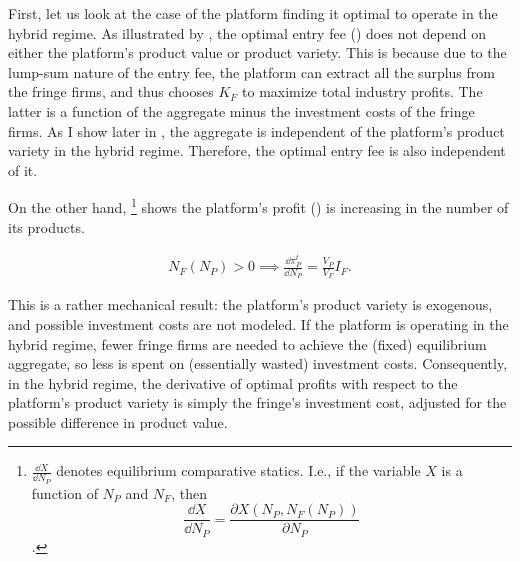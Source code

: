 First, let us look at the case of the platform finding it optimal to operate in the hybrid regime.
As illustrated by , the optimal entry fee () does not depend on either the platform's product value or product variety.
This is because due to the lump-sum nature of the entry fee, the platform can extract all the surplus from the fringe firms, and thus chooses $K_F$ to maximize total industry profits.
The latter is a function of the aggregate minus the investment costs of the fringe firms.
As I show later in , the aggregate is independent of the platform's product variety in the hybrid regime.
Therefore, the optimal entry fee is also independent of it.

On the other hand, \footnote{
    $\frac{\dd X}{\dd N_P}$ denotes equilibrium comparative statics.
 I.e., if the variable $X$ is a function of $N_P$ and $N_F$, then $$\frac{\dd X}{\dd N_P} = \frac{\partial X(N_P, N_F(N_P))}{\partial N_P}$$.
} shows the platform's profit () is increasing in the number of its products.
\begin{corollary}
    \label{prop:platform_profits_comparative_benchmark}
    \begin{align*}
        N_F(N_P) > 0 \implies \frac{\dd \pi_P^t}{\dd N_P} = \frac{V_P}{V_F} I_F.
    \end{align*}
\end{corollary}
This is a rather mechanical result: the platform's product variety is exogenous, and possible investment costs are not modeled.
If the platform is operating in the hybrid regime, fewer fringe firms are needed to achieve the (fixed) equilibrium aggregate, so less is spent on (essentially wasted) investment costs.
Consequently, in the hybrid regime, the derivative of optimal profits with respect to the platform's product variety is simply the fringe's investment cost, adjusted for the possible difference in product value.

